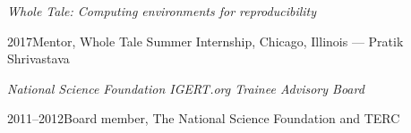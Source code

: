 \emph{Whole Tale: Computing environments for reproducibility}
\begin{list1}
\item[] 2017\hspace{.2cm}Mentor, Whole Tale Summer Internship, Chicago, Illinois — Pratik Shrivastava
\end{list1}

\emph{National Science Foundation IGERT.org Trainee Advisory Board}
\begin{list1}
\item[] 2011–2012\hspace{.2cm}Board member, The National Science Foundation and TERC
\end{list1}
